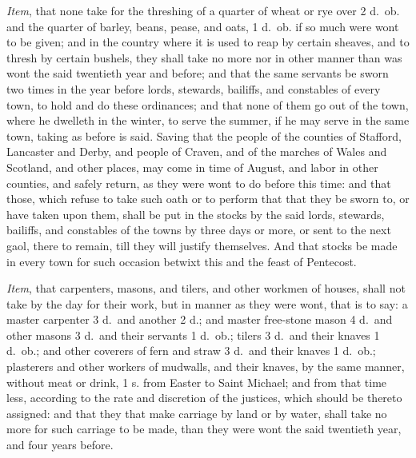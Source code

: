 \documentclass[
  letterpaper,
  11pt,
  DIV=9,
  openright]{scrbook}
\begin{document}

\emph{Item}, that none take for the threshing of a quarter of wheat or
rye over 2 d.~ob. and the quarter of barley, beans, pease, and oats, 1
d.~ob. if so much were wont to be given; and in the country where it is
used to reap by certain sheaves, and to thresh by certain bushels, they
shall take no more nor in other manner than was wont the said twentieth
year and before; and that the same servants be sworn two times in the
year before lords, stewards, bailiffs, and constables of every town, to
hold and do these ordinances; and that none of them go out of the town,
where he dwelleth in the winter, to serve the summer, if he may serve in
the same town, taking as before is said. Saving that the people of the
counties of Stafford, Lancaster and Derby, and people of Craven, and of
the marches of Wales and Scotland, and other places, may come in time of
August, and labor in other counties, and safely return, as they were
wont to do before this time: and that those, which refuse to take such
oath or to perform that that they be sworn to, or have taken upon them,
shall be put in the stocks by the said lords, stewards, bailiffs, and
constables of the towns by three days or more, or sent to the next gaol,
there to remain, till they will justify themselves. And that stocks be
made in every town for such occasion betwixt this and the feast of
Pentecost.


\emph{Item}, that carpenters, masons, and tilers, and other workmen of
houses, shall not take by the day for their work, but in manner as they
were wont, that is to say: a master carpenter 3 d.~and another 2 d.; and
master free-stone mason 4 d.~and other masons 3 d.~and their servants 1
d.~ob.; tilers 3 d.~and their knaves 1 d.~ob.; and other coverers of
fern and straw 3 d.~and their knaves 1 d.~ob.; plasterers and other
workers of mudwalls, and their knaves, by the same manner, without meat
or drink, 1 s. from Easter to Saint Michael; and from that time less,
according to the rate and discretion of the justices, which should be
thereto assigned: and that they that make carriage by land or by water,
shall take no more for such carriage to be made, than they were wont the
said twentieth year, and four years before.
\end{document}
